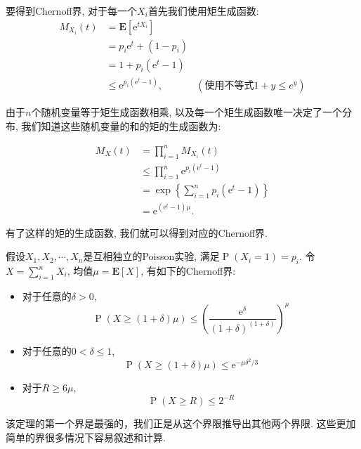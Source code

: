 要得到Chernoff界, 对于每一个$X_i$首先我们使用矩生成函数: 
$$
\begin{aligned}
M_{X_i}(t) & =\mathbf{E}\left[\mathrm{e}^{t X_i}\right] \\
& =p_i \mathrm{e}^t+\left(1-p_i\right) \\
& =1+p_i\left(\mathrm{e}^t-1\right) \\
& \leq \mathrm{e}^{p_i\left(\mathrm{e}^t-1\right)}, & (\text{使用不等式} 1+y\leq e^y)
\end{aligned}
$$

由于$n$个随机变量等于矩生成函数相乘, 以及每一个矩生成函数唯一决定了一个分布, 我们知道这些随机变量的和的矩的生成函数为: 

$$
\begin{aligned}
M_X(t) & =\prod_{i=1}^n M_{X_i}(t) \\
& \leq \prod_{i=1}^n \mathrm{e}^{p_i\left(\mathrm{e}^t-1\right)} \\
& =\exp \left\{\sum_{i=1}^n p_i\left(\mathrm{e}^t-1\right)\right\} \\
& =\mathrm{e}^{\left(\mathrm{e}^t-1\right) \mu} .
\end{aligned}
$$

有了这样的矩的生成函数, 我们就可以得到对应的Chernoff界. 
\begin{theorem}
    假设$X_1, X_2, \cdots, X_n$是互相独立的Poisson实验, 满足$\operatorname{P}\left(X_i=1\right)=p_i$. 令$X=\sum_{i=1}^n X_i$, 均值$\mu=\mathbf{E}[X]$, 有如下的Chernoff界: 
    \begin{itemize}
        \item 对于任意的$\delta>0$, $$\operatorname{P}(X \geq(1+\delta) \mu) \leq\left(\frac{\mathrm{e}^\delta}{(1+\delta)^{(1+\delta)}}\right)^\mu$$
        \item 对于任意的$0<\delta\leq 1$, $$
        \operatorname{P}(X \geq(1+\delta) \mu) \leq \mathrm{e}^{-\mu \delta^2 / 3}$$
        \item 对于$R\geq 6\mu$, $$
        \operatorname{P}(X \geq R) \leq 2^{-R}$$
    \end{itemize}
\end{theorem}

该定理的第一个界是最强的，我们正是从这个界限推导出其他两个界限. 这些更加简单的界很多情况下容易叙述和计算. 

